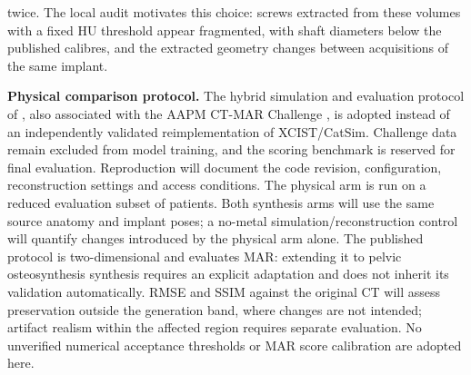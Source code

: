 \documentclass[9pt]{extarticle}
\newcommand{\BASESIM}{XCIST/CatSim}
\begin{document}
twice. The local audit motivates this choice: screws extracted from these volumes with a fixed HU threshold appear fragmented, with shaft diameters below the published calibres, and the extracted geometry changes between acquisitions of the same implant.

\textbf{Physical comparison protocol.} The hybrid simulation and evaluation protocol of \citet{peters2025hybrid}, also associated with the AAPM CT-MAR Challenge \citep{haneda2025aapm}, is adopted instead of an independently validated reimplementation of \BASESIM{}. Challenge data remain excluded from model training, and the scoring benchmark is reserved for final evaluation. Reproduction will document the code revision, configuration, reconstruction settings and access conditions. The physical arm is run on a reduced evaluation subset of patients. Both synthesis arms will use the same source anatomy and implant poses; a no-metal simulation/reconstruction control will quantify changes introduced by the physical arm alone. The published protocol is two-dimensional and evaluates MAR: extending it to pelvic osteosynthesis synthesis requires an explicit adaptation and does not inherit its validation automatically. RMSE and SSIM against the original CT will assess preservation outside the generation band, where changes are not intended; artifact realism within the affected region requires separate evaluation. No unverified numerical acceptance thresholds or MAR score calibration are adopted here.
\end{document}

